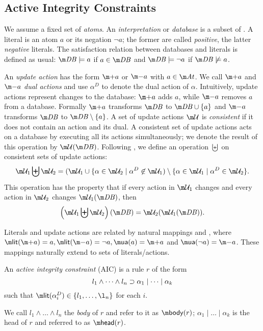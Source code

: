
\subsection{Active Integrity Constraints}
We assume a fixed set \atoms of \emph{atoms}. An \emph{interpretation} or \emph{database} is a subset of \atoms. A literal is an atom $a$ or its negation $\lnot a$; the former are called \emph{positive}, the latter \emph{negative} literals. 
The satisfaction relation between databases \db and literals is defined as usual: $\db \models a$ if $a\in\db$ and $\db \models \lnot a$ if $\db\not\models a$.

An \emph{update action} has the form $\add a$ or $\remove a$ with $a\in \atoms$. We call $\add a$ and $\remove a$ \emph{dual actions} and use $\alpha^D$ to denote the dual action of $\alpha$. 
Intuitively, update actions represent changes to the database: $\add a$ adds $a$, while $\remove a$ removes $a$ from a database. Formally $\add a$ transforms $\db$ to $\db\cup\{a\}$ and $\remove a $ transforms $\db$ to $\db\setminus\{a\}$. 
A set of update actions $\UU$ is \emph{consistent} if it does not contain an action and its dual. A consistent set of update actions \UU acts on a database \db by executing all its actions simultaneously; we denote the result of this operation by $\UU(\db)$. 
Following \cite{iclp/Cruz-Filipe16}, we define an operation $\biguplus$ on consistent sets of update actions: 
\[\UU_1 \biguplus \UU_2 = (\UU_1 \cup \{\alpha \in \UU_2 \mid \alpha^D\not \in \UU_1) \setminus \{\alpha\in \UU_1 \mid \alpha^D\in \UU_2\}.\]
This operation has the property that if every action in $\UU_1$ changes \db and every action in $\UU_2$ changes $\UU_1(\db)$, then 
\[\left(\UU_1\biguplus \UU_2\right)(\db) = \UU_2(\UU_1(\db)).\]

Literals and update actions are related by natural mappings \litof and \actof, where $\litof(\add a)= a, \litof(\remove a) = \lnot a, \actof(a) = \add a$ and $\actof(\lnot a) = \remove a$.  These mappings naturally extend to sets of literals/actions. 

\begin{definition}
 An \emph{active integrity constraint} (AIC) is a rule $r$ of the form
  \begin{equation} l_1\land \dots\land l_n\supset \alpha_1\mid\dots \mid \alpha_k \label{eq:aic}\end{equation}
  such that $\litof(\alpha_i^D) \in \{l_1,\dots,\l_n\}$ for each $i$.
  
  We call $l_1\land \dots \land l_n$ the \emph{body} of $r$ and refer to it as $\body(r)$; $\alpha_1\mid\dots \mid \alpha_k$ is the head of $r$ and referred to as $\head (r)$.
\end{definition}


